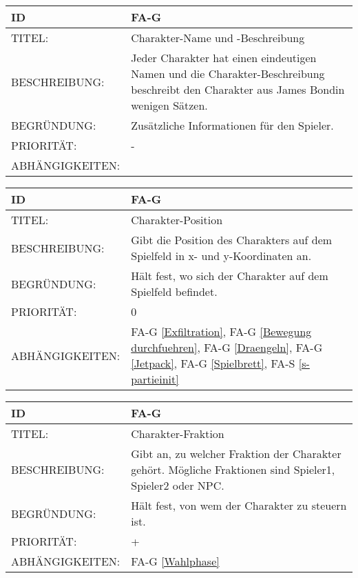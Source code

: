 \begin{tabularx}{16cm}{l|X}
	{table}\label{Charakter-NameBeschreibung}
	\textbf{ID} & \textbf{FA-G \arabic{table}} \\
	\hline
	TITEL: & Charakter-Name und -Beschreibung \\
	\hline
	BESCHREIBUNG: & Jeder Charakter hat einen eindeutigen Namen und die Charakter-Beschreibung beschreibt den Charakter aus \glqq James Bond\grqq in wenigen Sätzen.\\
	\hline
	BEGRÜNDUNG: & Zusätzliche Informationen für den Spieler. \\
	\hline
	PRIORITÄT: & -\\
	\hline
	ABHÄNGIGKEITEN: & \\
\end{tabularx}

\begin{tabularx}{16cm}{l|X}
	{table}\label{Charakter-Position}
	\textbf{ID} & \textbf{FA-G \arabic{table}} \\
	\hline
	TITEL: & Charakter-Position \\
	\hline
	BESCHREIBUNG: & Gibt die Position des Charakters auf dem Spielfeld in x- und y-Koordinaten an.\\
	\hline
	BEGRÜNDUNG: & Hält fest, wo sich der Charakter auf dem Spielfeld befindet.\\
	\hline
	PRIORITÄT: & 0\\
	\hline
	ABHÄNGIGKEITEN: & FA-G \ref{Exfiltration}, FA-G \ref{Bewegung durchfuehren}, FA-G \ref{Draengeln}, FA-G \ref{Jetpack}, FA-G \ref{Spielbrett}, FA-S \ref{s-partieinit}\\
\end{tabularx}

\begin{tabularx}{16cm}{l|X}
	{table}\label{Charakter-Fraktion}
	\textbf{ID} & \textbf{FA-G \arabic{table}} \\
	\hline
	TITEL: & Charakter-Fraktion \\
	\hline
	BESCHREIBUNG: & Gibt an, zu welcher Fraktion der Charakter gehört. Mögliche Fraktionen sind Spieler1, Spieler2 oder NPC.\\
	\hline
	BEGRÜNDUNG: & Hält fest, von wem der Charakter zu steuern ist.\\
	\hline
	PRIORITÄT: & +\\
	\hline
	ABHÄNGIGKEITEN: & FA-G \ref{Wahlphase}\\
\end{tabularx}

